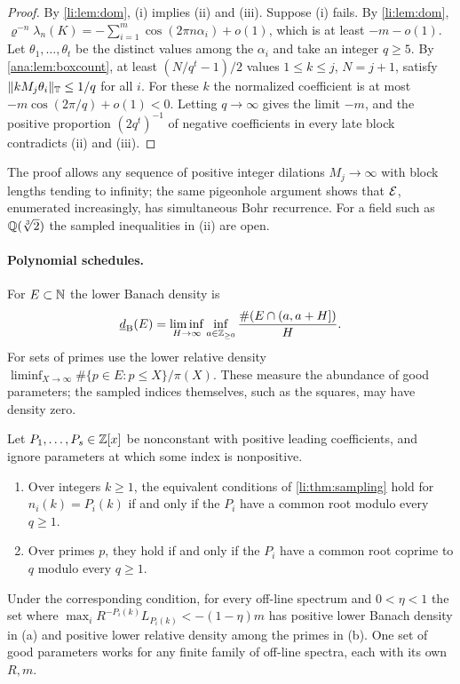 \begin{proof}
By \cref{li:lem:dom}, (i) implies (ii) and (iii). Suppose (i) fails. By \cref{li:lem:dom},
$\varrho^{-n}\lambda_n(K)=-\sum_{i=1}^m\cos(2\pi n\alpha_i)+o(1)$, which is at least $-m-o(1)$.
Let $\theta_1,\dots,\theta_t$ be the distinct values among the $\alpha_i$ and take an integer
$q\ge5$. By \cref{ana:lem:boxcount}, at least $(N/q^t-1)/2$ values $1\le k\le j$, $N=j+1$,
satisfy $\lVert kM_j\theta_i\rVert_{\mathbb{T}}\le1/q$ for all $i$. For these $k$ the normalized coefficient is at most
$-m\cos(2\pi/q)+o(1)<0$. Letting $q\to\infty$ gives the limit $-m$, and the positive proportion
$(2q^t)^{-1}$ of negative coefficients in every late block contradicts (ii) and (iii).
\end{proof}

The proof allows any sequence of positive integer dilations $M_j\to\infty$ with block lengths
tending to infinity; the same pigeonhole argument shows that $\mathcal{E}$, enumerated increasingly,
has simultaneous Bohr recurrence. For a field such as $\mathbb{Q}(\sqrt[3]2)$ the sampled
inequalities in (ii) are open.

\paragraph{Polynomial schedules.} For $E\subset\mathbb{N}$ the lower Banach density is
\[
 \underline d_{\mathrm B}(E)=\liminf_{H\to\infty}\inf_{a\in\mathbb{Z}_{\ge0}}\frac{\#(E\cap(a,a+H])}H .
\]
For sets of primes use the lower relative density
$\liminf_{X\to\infty}\#\{p\in E:p\le X\}/\pi(X)$.
These measure the abundance of good parameters; the sampled indices themselves, such as the
squares, may have density zero.

\begin{theorem}\label{li:thm:poly}
Let $P_1,\dots,P_s\in\mathbb{Z}[x]$ be nonconstant with positive leading coefficients, and ignore
parameters at which some index is nonpositive.
\begin{enumerate}[label=\textup{(\alph*)}]
\item Over integers $k\ge1$, the equivalent conditions of \cref{li:thm:sampling} hold for
 $n_i(k)=P_i(k)$ if and only if the $P_i$ have a common root modulo every $q\ge1$.
\item Over primes $p$, they hold if and only if the $P_i$ have a common root coprime to $q$
 modulo every $q\ge1$.
\end{enumerate}
Under the corresponding condition, for every off-line spectrum and $0<\eta<1$ the set where
$\max_iR^{-P_i(k)}L_{P_i(k)}<-(1-\eta)m$ has positive lower Banach density in \textup{(a)} and
positive lower relative density among the primes in \textup{(b)}. One set of good parameters
works for any finite family of off-line spectra, each with its own $R,m$.
\end{theorem}

